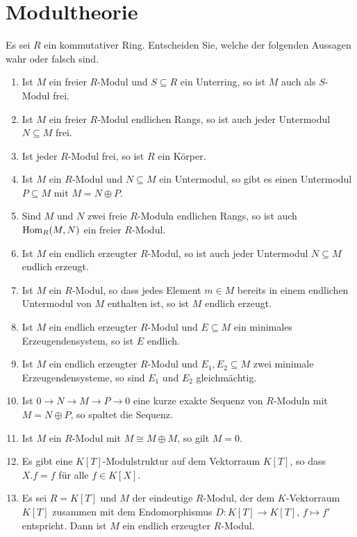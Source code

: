 \section{Modultheorie}




\begin{question}[subtitle = Multiple Choice]
  Es sei $R$ ein kommutativer Ring.
  Entscheiden Sie, welche der folgenden Aussagen wahr oder falsch sind.
  \begin{enumerate}
    \item
      Ist $M$ ein freier $R$-Modul und $S \subseteq R$ ein Unterring, so ist $M$ auch als $S$-Modul frei.
    \item
      Ist $M$ ein freier $R$-Modul endlichen Rangs, so ist auch jeder Untermodul $N \subseteq M$ frei.
    \item
      Ist jeder $R$-Modul frei, so ist $R$ ein Körper.
    \item
      Ist $M$ ein $R$-Modul und $N \subseteq M$ ein Untermodul, so gibt es einen Untermodul $P \subseteq M$ mit $M = N \oplus P$.
    \item
      Sind $M$ und $N$ zwei freie $R$-Moduln endlichen Rangs, so ist auch $\operatorname{Hom}_R(M, N)$ ein freier $R$-Modul.
    \item
      Ist $M$ ein endlich erzeugter $R$-Modul, so ist auch jeder Untermodul $N \subseteq M$ endlich erzeugt.
    \item
      Ist $M$ ein $R$-Modul, so dass jedes Element $m \in M$ bereits in einem endlichen Untermodul von $M$ enthalten ist, so ist $M$ endlich erzeugt.
    \item
      Ist $M$ ein endlich erzeugter $R$-Modul und $E \subseteq M$ ein minimales Erzeugendensystem, so ist $E$ endlich.
    \item
      Ist $M$ ein endlich erzeugter $R$-Modul und $E_1, E_2 \subseteq M$ zwei minimale Erzeugendensysteme, so sind $E_1$ und $E_2$ gleichmächtig.
    \item
      Ist $0 \to N \to M \to P \to 0$ eine kurze exakte Sequenz von $R$-Moduln mit $M = N \oplus P$, so spaltet die Sequenz.
    \item
      Ist $M$ ein $R$-Modul mit $M \cong M \oplus M$, so gilt $M = 0$.
    \item
      Es gibt eine $K[T]$-Modulstruktur auf dem Vektorraum $K[T]$, so dass $X.f = f$ für alle $f \in K[X]$.
    \item
      Es sei $R = K[T]$ und $M$ der eindeutige $R$-Modul, der dem $K$-Vektorraum $K[T]$ zusammen mit dem Endomorphismus $D \colon K[T] \to K[T]$, $f \mapsto f'$ entspricht.
      Dann ist $M$ ein endlich erzeugter $R$-Modul.
  \end{enumerate}
\end{question}


